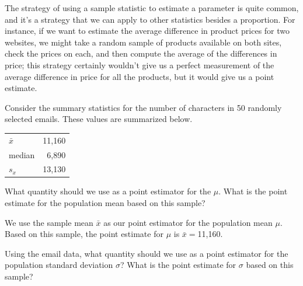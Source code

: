 The strategy of using a sample statistic to estimate
a parameter is quite common, and it's a strategy that
we can apply to other statistics besides a proportion.
For instance, if we want to estimate the average
difference in product prices for two websites,
we might take a random sample of products available
on both sites, check the prices on each,
and then compute the average of the differences in price;
this strategy certainly wouldn't give us a perfect
measurement of the average difference in price for all the products, but it would
give us a point estimate.

\begin{examplewrap}
\begin{nexample}{
Consider the summary statistics for the number of characters in 50 randomly selected emails.  These values are summarized below.
\begin{center}
\begin{tabular}{l r }
$\bar{x}$ & 11,160 \\
median & 6,890 \\
$s_x$ & 13,130
\end{tabular}
\end{center}
What quantity should we use as a point estimator for the  $\mu$.  What is the point estimate for the population mean based on this sample?}We use the sample mean $\bar{x}$ as our point estimator for the population mean $\mu$.  Based on this sample, the point estimate for $\mu$ is $\bar{x} = $11,160.
\end{nexample}
\end{examplewrap}

\begin{exercisewrap}
\begin{nexercise}Using the email data, what quantity should we use as a point estimator for the population standard deviation $\sigma$?  What is the point estimate for $\sigma$ based on this sample?\footnotemark
\end{nexercise}
\end{exercisewrap}
\vspace{-4mm}





